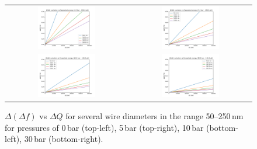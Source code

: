 \documentclass[a4paper,12pt]{article}
\begin{document}
\begin{figure}[!ht]
  \begin{center}
  \begin{tabular}{cc}
    \includegraphics[width=0.49\textwidth]{DeltaDeltaW_vs_DE_wire-0bar}  &
    \includegraphics[width=0.49\textwidth]{DeltaDeltaW_vs_DE_wire-5bar}  \\
    \includegraphics[width=0.49\textwidth]{DeltaDeltaW_vs_DE_wire-10bar} &
    \includegraphics[width=0.49\textwidth]{DeltaDeltaW_vs_DE_wire-30bar}
  \end{tabular}
  \end{center}
  \caption{$\Delta(\Delta f)$ vs $\Delta Q$ for several wire diameters in the range 50--250\,nm for pressures of 0\,bar (top-left), 5\,bar (top-right), 10\,bar (bottom-left), 30\,bar (bottom-right).}
  \label{fig:DeltaDeltaWvsDE-wire}
\end{figure}
\end{document}
